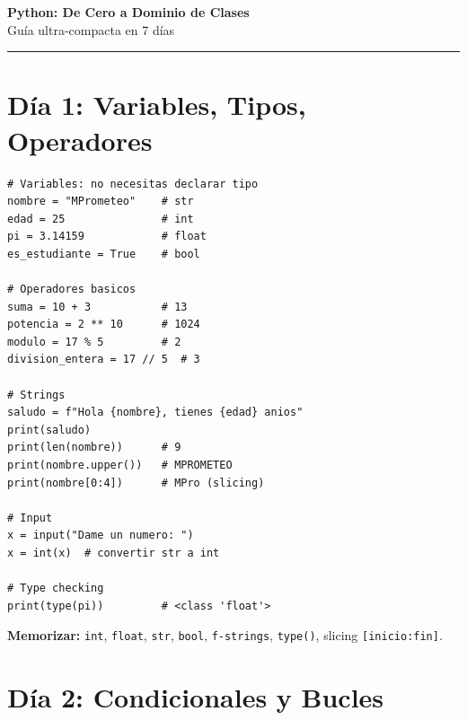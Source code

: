 \documentclass[10pt,a4paper]{article}
\begin{document}
\begin{center}
{\LARGE \textbf{Python: De Cero a Dominio de Clases}}\\[4pt]
{\large Gu\'ia ultra-compacta en 7 d\'ias}\\[2pt]
\rule{\textwidth}{0.8pt}
\end{center}

\section*{D\'ia 1: Variables, Tipos, Operadores}

\begin{lstlisting}
# Variables: no necesitas declarar tipo
nombre = "MPrometeo"    # str
edad = 25               # int
pi = 3.14159            # float
es_estudiante = True    # bool

# Operadores basicos
suma = 10 + 3           # 13
potencia = 2 ** 10      # 1024
modulo = 17 % 5         # 2
division_entera = 17 // 5  # 3

# Strings
saludo = f"Hola {nombre}, tienes {edad} anios"
print(saludo)
print(len(nombre))      # 9
print(nombre.upper())   # MPROMETEO
print(nombre[0:4])      # MPro (slicing)

# Input
x = input("Dame un numero: ")
x = int(x)  # convertir str a int

# Type checking
print(type(pi))         # <class 'float'>
\end{lstlisting}

\textbf{Memorizar:} \texttt{int}, \texttt{float}, \texttt{str},
\texttt{bool}, \texttt{f-strings}, \texttt{type()}, slicing
\texttt{[inicio:fin]}.

\section*{D\'ia 2: Condicionales y Bucles}
\end{document}
